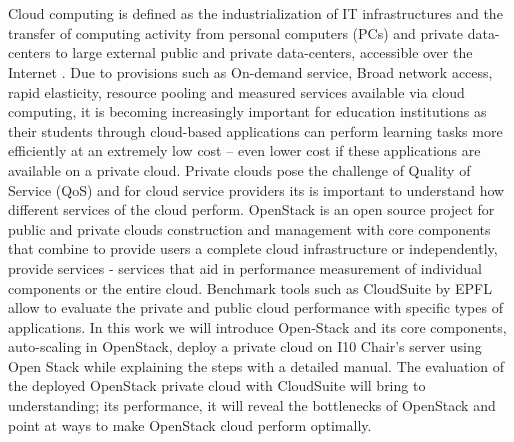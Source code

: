 \chapter*{\abstractname}
Cloud computing is defined as the industrialization of IT infrastructures and the transfer of computing activity from personal computers (PCs) and private data-centers to large external public and private data-centers, accessible over the Internet \cite{Boss2007}. Due to provisions such as On-demand service, Broad network access, rapid elasticity, resource pooling and measured services available via cloud computing, it is becoming increasingly important for education institutions as their students through cloud-based applications can perform learning tasks more efficiently at an extremely low cost – even lower cost if these applications are available on a private cloud. Private clouds pose the challenge of Quality of Service (QoS) and for cloud service providers its is important to understand how different services of the cloud perform. OpenStack is an open source project for public and private clouds construction and management with core components that combine to provide users a complete cloud infrastructure or independently, provide services - services that aid in performance measurement of individual components or the entire cloud. Benchmark tools such as CloudSuite by EPFL allow to evaluate the private and public cloud performance with specific types of applications. In this work we will introduce Open-Stack and its core components, auto-scaling in OpenStack, deploy a private cloud on I10 Chair's server using Open Stack while explaining the steps with a detailed manual. The evaluation of the deployed OpenStack private cloud with CloudSuite will bring to understanding; its performance, it will reveal the bottlenecks of OpenStack and point at ways to make OpenStack cloud perform optimally.